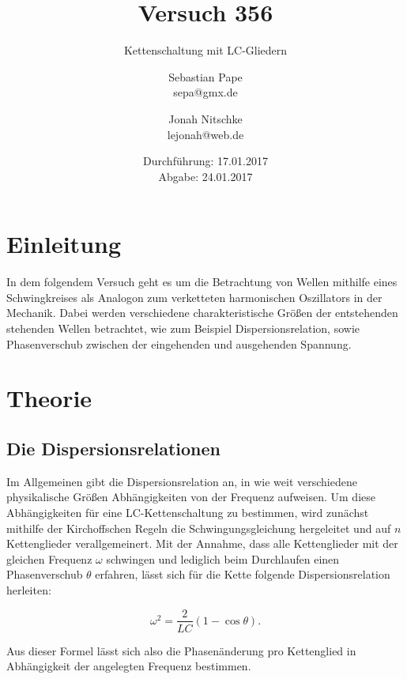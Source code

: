 

\title{Versuch 356}
\subtitle{Kettenschaltung mit LC-Gliedern}
\author{Sebastian Pape\\
        sepa@gmx.de \and
        Jonah Nitschke\\
        lejonah@web.de}
\date{Durchführung: 17.01.2017\\
      Abgabe: 24.01.2017}


\maketitle

\section{Einleitung}

In dem folgendem Versuch geht es um die Betrachtung von Wellen mithilfe eines
Schwingkreises als Analogon zum verketteten harmonischen Oszillators in der
Mechanik. Dabei werden verschiedene charakteristische Größen der entstehenden
stehenden Wellen betrachtet, wie zum Beispiel Dispersionsrelation, sowie Phasenverschub
zwischen der eingehenden und ausgehenden Spannung.

\section{Theorie}

\subsection{Die Dispersionsrelationen}

Im Allgemeinen gibt die Dispersionsrelation an, in wie weit verschiedene physikalische
Größen Abhängigkeiten von der Frequenz aufweisen. Um diese Abhängigkeiten für
eine LC-Kettenschaltung zu bestimmen, wird zunächst mithilfe der Kirchoffschen
Regeln die Schwingungsgleichung hergeleitet und auf $n$ Kettenglieder verallgemeinert.
Mit der Annahme, dass alle Kettenglieder mit der gleichen Frequenz $\omega$ schwingen
und lediglich beim Durchlaufen einen Phasenverschub $\theta$ erfahren, lässt sich
für die Kette folgende Dispersionsrelation herleiten:

\begin{equation}
  \omega^2 = \frac{2}{LC}(1-\cos{\theta}) .
  \label{eqn:RelationC}
\end{equation}

Aus dieser Formel lässt sich also die Phasenänderung pro Kettenglied in Abhängigkeit
der angelegten Frequenz bestimmen.

